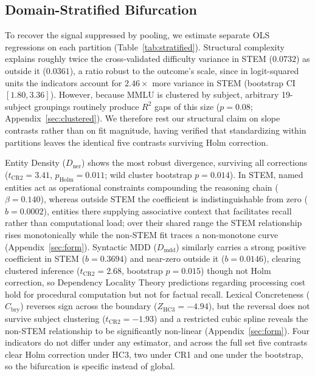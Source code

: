 \subsection{Domain-Stratified Bifurcation}\label{domain-stratified-bifurcation}

To recover the signal suppressed by pooling, we estimate separate OLS regressions on each partition (Table~\ref{tab:stratified}). Structural complexity explains roughly twice the cross-validated difficulty variance in STEM ($0.0732$) as outside it ($0.0361$), a ratio robust to the outcome's scale, since in logit-squared units the indicators account for $2.46\times$ more variance in STEM (bootstrap CI $[1.80,3.36]$). However, because MMLU is clustered by subject, arbitrary 19-subject groupings routinely produce $R^{2}$ gaps of this size ($p = 0.08$; Appendix~\ref{sec:clustered}). We therefore rest our structural claim on slope contrasts rather than on fit magnitude, having verified that standardizing within partitions leaves the identical five contrasts surviving Holm correction.

Entity Density ($D_{\text{ner}}$) shows the most robust divergence, surviving all corrections ($t_{\text{CR2}} = 3.41$, $p_{\text{Holm}} = 0.011$; wild cluster bootstrap $p = 0.014$). In STEM, named entities act as operational constraints compounding the reasoning chain ($\beta = 0.140$), whereas outside STEM the coefficient is indistinguishable from zero ($b = 0.0002$), entities there supplying associative context that facilitates recall rather than computational load; over their shared range the STEM relationship rises monotonically while the non-STEM fit traces a non-monotone curve (Appendix~\ref{sec:form}). Syntactic MDD ($D_{\text{mdd}}$) similarly carries a strong positive coefficient in STEM ($b = 0.3694$) and near-zero outside it ($b = 0.0146$), clearing clustered inference ($t_{\text{CR2}} = 2.68$, bootstrap $p = 0.015$) though not Holm correction, so Dependency Locality Theory predictions regarding processing cost hold for procedural computation but not for factual recall. Lexical Concreteness ($C_{\text{bry}}$) reverses sign across the boundary ($Z_{\text{HC3}} = -4.94$), but the reversal does not survive subject clustering ($t_{\text{CR2}} = -1.93$) and a restricted cubic spline reveals the non-STEM relationship to be significantly non-linear (Appendix~\ref{sec:form}). Four indicators do not differ under any estimator, and across the full set five contrasts clear Holm correction under HC3, two under CR1 and one under the bootstrap, so the bifurcation is specific instead of global.

